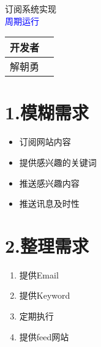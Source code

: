 \documentclass[a4paper,oneside,12pt]{book}
\newenvironment{SChinese}{
  \CJKfamily{gkai}
  \CJKtilde
  \CJKnospace}{}
\begin{document}
\begin{CJK*}{UTF8}{kai}
\begin{SChinese}
\begin{center}
\huge{订阅系统实现}\\
 \textcolor{blue}{\Large{周期运行}\\}
 \normalsize{}
\vspace{1cm} 
\begin{tabular}{|l|l|}
\hline
开发者\\
\hline
解朝勇\\
\hline
\end{tabular}
\end{center}
\begin{flushleft}
\section*{1.模糊需求}
\begin{itemize}
\item{订阅网站内容}
\item{提供感兴趣的关键词}
\item{推送感兴趣内容}
\item{推送讯息及时性}
\end{itemize}
\section*{2.整理需求}
\begin{enumerate}
\item{ 提供Email}
\item{ 提供Keyword}
\item{ 定期执行}
\item{ 提供feed网站}
\end{enumerate}
\end{flushleft}
\end{SChinese}
\end{CJK*}
\end{document}
